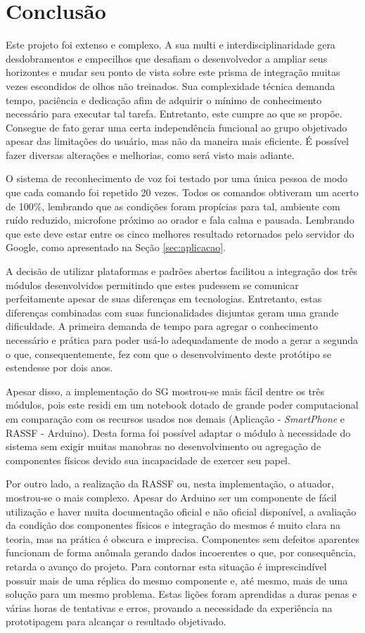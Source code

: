 \documentclass[12pt,a4paper,oneside]{report}
\begin{document}
\chapter{Conclusão}
\label{chap:conclusao}

Este projeto foi extenso e complexo. A sua multi e interdisciplinaridade gera desdobramentos e empecilhos que desafiam o desenvolvedor a ampliar seus horizontes e mudar seu ponto de vista sobre este prisma de integração muitas vezes escondidos de olhos não treinados. Sua complexidade técnica demanda tempo, paciência e dedicação afim de adquirir o mínimo de conhecimento necessário para executar tal tarefa. Entretanto, este cumpre ao que se propõe. Consegue de fato gerar uma certa independência funcional ao grupo objetivado apesar das limitações do usuário, mas não da maneira mais eficiente. É possível fazer diversas alterações e melhorias, como será visto mais adiante.

O sistema de reconhecimento de voz foi testado por uma única pessoa de modo que cada comando foi repetido 20 vezes. Todos os comandos obtiveram um acerto de 100\%, lembrando que as condições foram propícias para tal, ambiente com ruído reduzido, microfone próximo ao orador e fala calma e pausada. Lembrando que este deve estar entre os cinco melhores resultado retornados pelo servidor do Google, como apresentado na Seção \ref{sec:aplicacao}.

A decisão de utilizar plataformas e padrões abertos facilitou a integração dos três módulos desenvolvidos permitindo que estes pudessem se comunicar perfeitamente apesar de suas diferenças em tecnologias. Entretanto, estas diferenças combinadas com suas funcionalidades disjuntas geram uma grande dificuldade. A primeira demanda de tempo para agregar o conhecimento necessário e prática para poder usá-lo adequadamente de modo a gerar a segunda o que, consequentemente, fez com que o desenvolvimento deste protótipo se estendesse por dois anos.

Apesar disso, a implementação do SG mostrou-se mais fácil dentre os três módulos, pois este residi em um notebook dotado de grande poder computacional em comparação com os recursos usados nos demais (Aplicação - \emph{SmartPhone} e RASSF - Arduino). Desta forma foi possível adaptar o módulo à necessidade do sistema sem exigir muitas manobras no desenvolvimento ou agregação de componentes físicos devido sua incapacidade de exercer seu papel.

Por outro lado, a realização da RASSF ou, nesta implementação, o atuador, mostrou-se o mais complexo. Apesar do Arduino ser um componente de fácil utilização e haver muita documentação oficial e não oficial disponível, a avaliação da condição dos componentes físicos e integração do mesmos é muito clara na teoria, mas na prática é obscura e imprecisa. Componentes sem defeitos aparentes funcionam de forma anômala gerando dados incoerentes o que, por consequência, retarda o avanço do projeto. Para contornar esta situação é imprescindível possuir mais de uma réplica do mesmo componente e, até mesmo, mais de uma solução para um mesmo problema. Estas lições foram aprendidas a duras penas e várias horas de tentativas e erros, provando a necessidade da experiência na prototipagem para alcançar o resultado objetivado.
\end{document}
